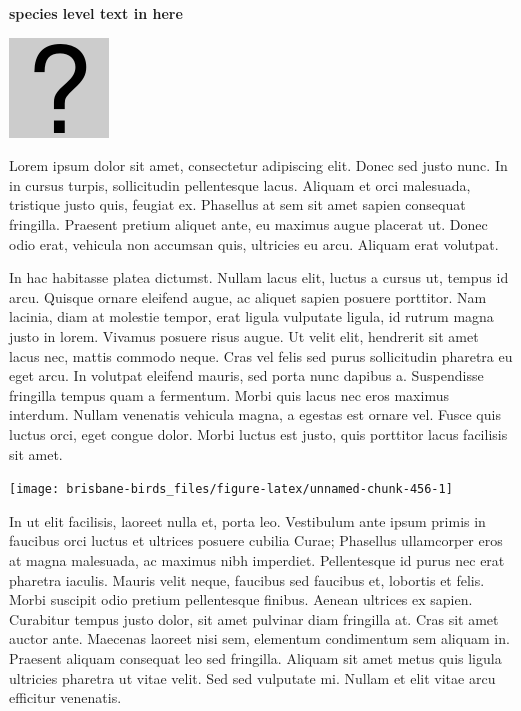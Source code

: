 \documentclass[]{book}
\let\origfigure\figure
\let\endorigfigure\endfigure
\renewenvironment{figure}[1][2] {
  \expandafter\origfigure\expandafter[H]
} {
  \endorigfigure
}
\begin{document}
\textbf{species level text in here}

\begin{figure}
\centering
\includegraphics{assets/missing.png}
\caption{No image for species}
\end{figure}

Lorem ipsum dolor sit amet, consectetur adipiscing elit. Donec sed justo
nunc. In in cursus turpis, sollicitudin pellentesque lacus. Aliquam et
orci malesuada, tristique justo quis, feugiat ex. Phasellus at sem sit
amet sapien consequat fringilla. Praesent pretium aliquet ante, eu
maximus augue placerat ut. Donec odio erat, vehicula non accumsan quis,
ultricies eu arcu. Aliquam erat volutpat.

In hac habitasse platea dictumst. Nullam lacus elit, luctus a cursus ut,
tempus id arcu. Quisque ornare eleifend augue, ac aliquet sapien posuere
porttitor. Nam lacinia, diam at molestie tempor, erat ligula vulputate
ligula, id rutrum magna justo in lorem. Vivamus posuere risus augue. Ut
velit elit, hendrerit sit amet lacus nec, mattis commodo neque. Cras vel
felis sed purus sollicitudin pharetra eu eget arcu. In volutpat eleifend
mauris, sed porta nunc dapibus a. Suspendisse fringilla tempus quam a
fermentum. Morbi quis lacus nec eros maximus interdum. Nullam venenatis
vehicula magna, a egestas est ornare vel. Fusce quis luctus orci, eget
congue dolor. Morbi luctus est justo, quis porttitor lacus facilisis sit
amet.

\begin{figure}
\texttt{[image: brisbane-birds\_files/figure-latex/unnamed-chunk-456-1]} \caption{insert figure caption}\label{fig:unnamed-chunk-456}
\end{figure}

In ut elit facilisis, laoreet nulla et, porta leo. Vestibulum ante ipsum
primis in faucibus orci luctus et ultrices posuere cubilia Curae;
Phasellus ullamcorper eros at magna malesuada, ac maximus nibh
imperdiet. Pellentesque id purus nec erat pharetra iaculis. Mauris velit
neque, faucibus sed faucibus et, lobortis et felis. Morbi suscipit odio
pretium pellentesque finibus. Aenean ultrices ex sapien. Curabitur
tempus justo dolor, sit amet pulvinar diam fringilla at. Cras sit amet
auctor ante. Maecenas laoreet nisi sem, elementum condimentum sem
aliquam in. Praesent aliquam consequat leo sed fringilla. Aliquam sit
amet metus quis ligula ultricies pharetra ut vitae velit. Sed sed
vulputate mi. Nullam et elit vitae arcu efficitur venenatis.
\end{document}
